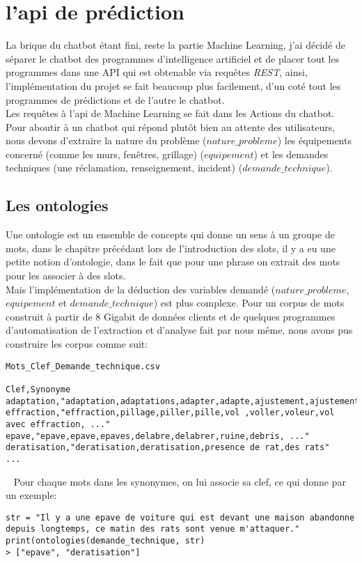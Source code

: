 \chapter{l'api de prédiction}
La brique du chatbot étant fini, reste la partie Machine Learning, j'ai décidé de séparer le chatbot des programmes d'intelligence artificiel et de placer tout les programmes dans une API qui est obtenable via requêtes \textit{REST}, ainsi, l'implémentation du projet se fait beaucoup plus facilement, d'un coté tout les programmes de prédictions et de l'autre le chatbot.\\
Les requêtes à l'api de Machine Learning se fait dans les Actions du chatbot.\\
\linebreak
Pour aboutir à un chatbot qui répond plutôt bien au attente des utilisateurs, nous devons d'extraire la nature du problème ($nature\_probleme$) les équipements concerné (comme les murs, fenêtres, grillage) ($equipement$) et les demandes techniques (une réclamation, renseignement, incident)  ($demande\_technique$).

\pagebreak
\section{Les ontologies}
Une ontologie est un ensemble de concepts qui donne un sens à un groupe de mots, dans le chapitre précédant lors de l'introduction des slots, il y a eu une petite notion d'ontologie, dans le fait que pour une phrase on extrait des mots pour les associer à des slots.\\
Mais l'implémentation de la déduction des variables demandé ($nature\_probleme$, $equipement$ et $demande\_technique$) est plus complexe. Pour un corpus de mots construit à partir de 8 Gigabit de données clients et de quelques programmes d'automatisation de l'extraction et d'analyse fait par nous même, nous avons pus construire les corpus comme suit:
\ \linebreak
\begin{lstlisting}
Mots_Clef_Demande_technique.csv

Clef,Synonyme
adaptation,"adaptation,adaptations,adapter,adapte,ajustement,ajustements,ajuster,..."
effraction,"effraction,pillage,piller,pille,vol ,voller,voleur,vol avec effraction, ..."
epave,"epave,epave,epaves,delabre,delabrer,ruine,debris, ..."
deratisation,"deratisation,deratisation,presence de rat,des rats"
...
\end{lstlisting}
\ \linebreak
Pour chaque mots dans les synonymes, on lui associe sa clef, ce qui donne par un exemple:
\ \linebreak
\begin{lstlisting}
str = "Il y a une epave de voiture qui est devant une maison abandonne depuis longtemps, ce matin des rats sont venue m'attaquer."
print(ontologies(demande_technique, str)
> ["epave", "deratisation"]
\end{lstlisting}
\ \linebreak

